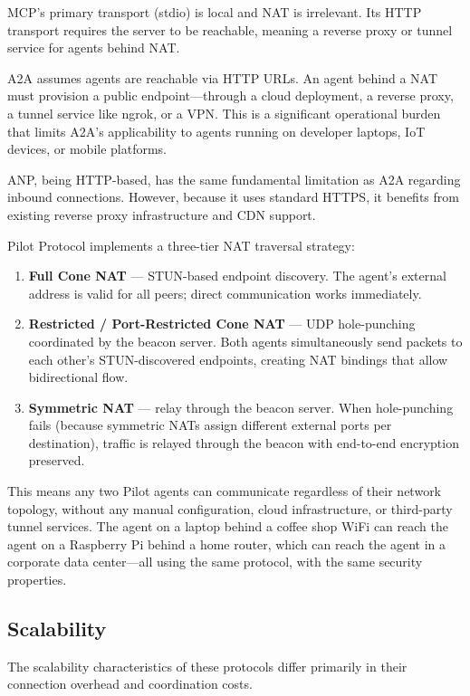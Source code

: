 \documentclass[11pt,a4paper]{article}
\begin{document}
MCP's primary transport (stdio) is local and NAT is irrelevant. Its HTTP transport requires the server to be reachable, meaning a reverse proxy or tunnel service for agents behind NAT.

A2A assumes agents are reachable via HTTP URLs. An agent behind a NAT must provision a public endpoint---through a cloud deployment, a reverse proxy, a tunnel service like ngrok, or a VPN. This is a significant operational burden that limits A2A's applicability to agents running on developer laptops, IoT devices, or mobile platforms.

ANP, being HTTP-based, has the same fundamental limitation as A2A regarding inbound connections. However, because it uses standard HTTPS, it benefits from existing reverse proxy infrastructure and CDN support.

Pilot Protocol implements a three-tier NAT traversal strategy:

\begin{enumerate}
    \item \textbf{Full Cone NAT} --- STUN-based endpoint discovery. The agent's external address is valid for all peers; direct communication works immediately.
    \item \textbf{Restricted / Port-Restricted Cone NAT} --- UDP hole-punching coordinated by the beacon server. Both agents simultaneously send packets to each other's STUN-discovered endpoints, creating NAT bindings that allow bidirectional flow.
    \item \textbf{Symmetric NAT} --- relay through the beacon server. When hole-punching fails (because symmetric NATs assign different external ports per destination), traffic is relayed through the beacon with end-to-end encryption preserved.
\end{enumerate}

This means any two Pilot agents can communicate regardless of their network topology, without any manual configuration, cloud infrastructure, or third-party tunnel services. The agent on a laptop behind a coffee shop WiFi can reach the agent on a Raspberry Pi behind a home router, which can reach the agent in a corporate data center---all using the same protocol, with the same security properties.

\subsection{Scalability}

The scalability characteristics of these protocols differ primarily in their connection overhead and coordination costs.
\end{document}
